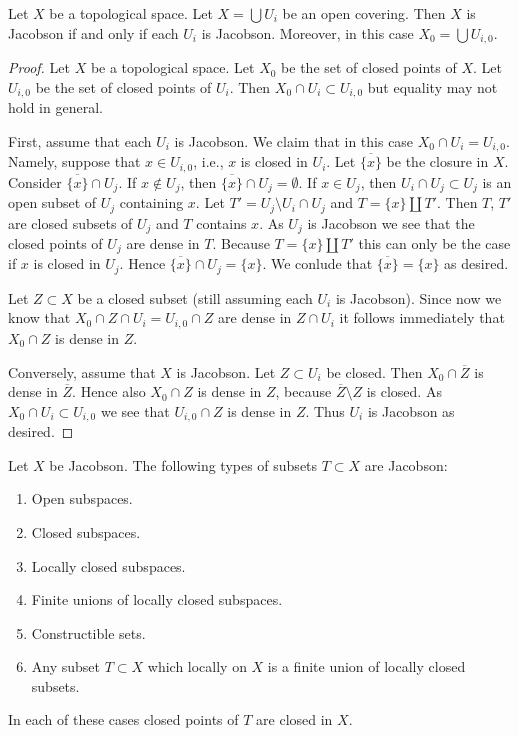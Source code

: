 \begin{lemma}
\label{lemma-jacobson-local}
Let $X$ be a topological space.
Let $X = \bigcup U_i$ be an open covering.
Then $X$ is Jacobson if and only if each $U_i$ is Jacobson.
Moreover, in this case $X_0 = \bigcup U_{i, 0}$.
\end{lemma}

\begin{proof}
Let $X$ be a topological space.
Let $X_0$ be the set of closed points of $X$.
Let $U_{i, 0}$ be the set of closed points of
$U_i$. Then $X_0 \cap U_i \subset U_{i, 0}$
but equality may not hold in general.

\medskip\noindent
First, assume that each $U_i$ is Jacobson.
We claim that in this case $X_0 \cap U_i = U_{i, 0}$.
Namely, suppose that $x \in U_{i, 0}$, i.e., $x$ is closed in
$U_i$. Let $\overline{\{x\}}$ be the closure
in $X$. Consider $\overline{\{x\}} \cap U_j$.
If $x \not \in U_j$, then $\overline{\{x\}} \cap U_j = \emptyset$.
If $x \in U_j$, then $U_i \cap U_j \subset U_j$
is an open subset of $U_j$ containing $x$.
Let $T' = U_j \setminus U_i \cap U_j$ and
$T = \{x\} \coprod T'$. Then $T$, $T'$
are closed subsets of $U_j$ and $T$ contains
$x$. As $U_j$ is Jacobson we see that the closed points of
$U_j$ are dense in $T$. Because $T = \{x\} \coprod T'$
this can only be the case if $x$ is closed in $U_j$.
Hence $\overline{\{x\}} \cap U_j = \{x\}$. We conlude
that $\overline{\{x\}} = \{ x \}$ as desired.

\medskip\noindent
Let $Z \subset X$ be a closed subset (still
assuming each $U_i$ is Jacobson).
Since now we know that $X_0 \cap Z  \cap U_i
= U_{i, 0} \cap Z$ are dense in $Z \cap U_i$
it follows immediately that $X_0 \cap Z$ is
dense in $Z$.

\medskip\noindent
Conversely, assume that $X$ is Jacobson.
Let $Z \subset U_i$ be closed. Then
$X_0 \cap \overline{Z}$ is dense in $\overline{Z}$.
Hence also $X_0 \cap Z$ is dense in $Z$, because
$\overline{Z} \setminus Z$ is closed. As $X_0 \cap U_i
\subset U_{i, 0}$ we see that
$U_{i, 0} \cap Z$ is dense in $Z$.
Thus $U_i$ is Jacobson as desired.
\end{proof}

\begin{lemma}
\label{lemma-jacobson-inherited}
Let $X$ be Jacobson. The following types of subsets $T \subset X$
are Jacobson:
\begin{enumerate}
\item Open subspaces.
\item Closed subspaces.
\item Locally closed subspaces.
\item Finite unions of locally closed subspaces.
\item Constructible sets.
\item Any subset $T \subset X$ which locally on $X$
is a finite union of locally closed subsets.
\end{enumerate}
In each of these cases closed points of $T$ are
closed in $X$.
\end{lemma}

